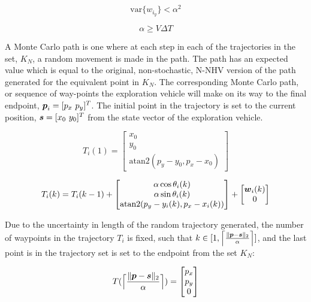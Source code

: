 \begin{equation}
\text{var}\{w_{i_y}\} < \alpha^2
\end{equation}

\begin{equation}
\alpha \geq V \Delta T
\end{equation}

A Monte Carlo path is one where at each step in each of the trajectories in the set, $K_N$, a random movement is made in the path. The path has an expected value which is equal to the original, non-stochastic, N-NHV version of the path generated for the equivalent point in $K_N$. The corresponding Monte Carlo path, or sequence of way-points the exploration vehicle will make on its way to the final endpoint, ${\it{\boldsymbol{p}}}_i = [p_x\ p_y]^T$. The initial point in the trajectory is set to the current position, ${\it{\boldsymbol{s}}}=[x_0\ y_0]^T$ from the state vector of the exploration vehicle.

\begin{equation}
	T_{i}(1) = \begin{bmatrix}
		x_0 \\
		y_0\\
		\text{atan2}(p_y - y_0, p_x - x_0)
	\end{bmatrix}
\end{equation}

\begin{equation}
	T_{i}(k) = T_{i}(k-1) +
	\begin{bmatrix}
		\alpha \cos \theta_i(k) \\
		\alpha \sin \theta_i(k) \\
		\text{atan2}(p_y - y_i(k), p_x - x_i(k))
	\end{bmatrix} + \begin{bmatrix} 
		{\it{\boldsymbol{w}}}_i(k) \\
		0
	\end{bmatrix}
\end{equation}

Due to the uncertainty in length of the random trajectory generated, the number of waypoints in the trajectory $T_i$ is fixed, such that $k \in [1, \Big\lceil \frac{\|{\it{\boldsymbol{p}}}- {\it{\boldsymbol{s}}}\|_2}{\alpha} \Big\rceil]$, and the last point is in the trajectory set is set to the endpoint from the set $K_N$:

\begin{equation}
	T(\Big\lceil \frac{\|{\it{\boldsymbol{p}}} - {\it{\boldsymbol{s}}}\|_2}{\alpha} \Big\rceil) = \begin{bmatrix} p_x \\ p_y \\ 0\end{bmatrix}
\end{equation}

